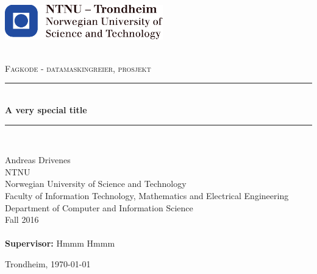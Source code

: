 \begin{titlepage}
\centering

\begin{center}
    \includegraphics[height=1.5cm]{fig/ntnu_logo.pdf}\\[1cm]
\end{center}

\begin{center}

\newcommand{\myauthor}{Andreas Drivenes} 
\newcommand{\mytitle}{A very special title}


~\\[1.5cm]

\textsc{\Large Fagkode - datamaskingreier, prosjekt
}\\[0.5cm]

\hrule ~\\[0.2cm]
{\huge \bfseries \mytitle}\\[0.4cm]		%
\hrule ~\\[1.5cm]

\begin{minipage}{0.7\textwidth}
    \centering
	\large
		\myauthor\\
		\vspace{2.0cm}
		\small NTNU \\
        Norwegian University of Science and Technology \\
        Faculty of Information Technology, Mathematics and Electrical Engineering \\
        Department of Computer and Information Science \\
		Fall 2016\\~\\
		\large\textbf{Supervisor:} Hmmm Hmmm\\
\end{minipage}

\vfill

{\large Trondheim, \today}

\end{center}
\end{titlepage}